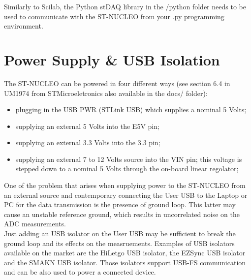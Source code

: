 \documentclass[letterpaper,10pt,english]{hitec}
\begin{document}
Similarly to Scilab, the Python stDAQ library in the /python folder needs to be used to communicate with the ST-NUCLEO from your .py programming environment.

\newpage

\section{Power Supply \& USB Isolation}

The ST-NUCLEO can be powered in four different ways (see section 6.4 in UM1974 from STMicroeletronics also available in the docs/ folder):
\begin{itemize}
\item plugging in the USB PWR (STLink USB) which supplies a nominal 5 Volts; 
\item supplying an external 5 Volts into the E5V pin;
\item supplying an external 3.3 Volts into the 3.3 pin;
\item supplying an external 7 to 12 Volts source into the VIN pin; this voltage is stepped down to a nominal 5 Volts through the on-board linear regolator;
\end{itemize}

One of the problem that arises when supplying power to the ST-NUCLEO from an external source and contemporary connecting the User USB to the Laptop or PC for the data transmission is the presence of ground loop. This latter may cause an unstable reference ground, which results in uncorrelated noise on the ADC measurements. \\
Just adding an USB isolator on the User USB may be sufficient to break the ground loop and its effects on the measruements.
Examples of USB isolators available on the market are the HiLetgo USB isolator, the EZSync USB isolator and the SMAKN USB isolator. Those isolators support USB-FS communication and can be also used to power a connected device.


\end{document}
